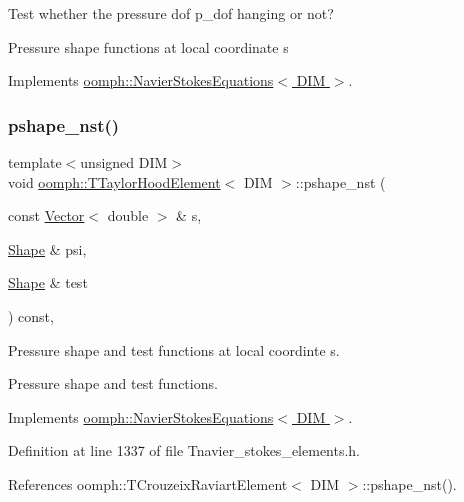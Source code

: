 Test whether the pressure dof p\+\_\+dof hanging or not? 

Pressure shape functions at local coordinate s 

Implements \hyperlink{classoomph_1_1NavierStokesEquations_a487030303b71da299aed3d4639a022ab}{oomph\+::\+Navier\+Stokes\+Equations$<$ D\+I\+M $>$}.

\mbox{\label{classoomph_1_1TTaylorHoodElement_a73ffecb519bf03336ea6cfe2eb7567df}} 
\subsubsection{\texorpdfstring{pshape\+\_\+nst()}{pshape\_nst()}\hspace{0.1cm}{\footnotesize\ttfamily [2/4]}}
{\footnotesize\ttfamily template$<$unsigned D\+IM$>$ \\
void \hyperlink{classoomph_1_1TTaylorHoodElement}{oomph\+::\+T\+Taylor\+Hood\+Element}$<$ D\+IM $>$\+::pshape\+\_\+nst (\begin{DoxyParamCaption}\item[{const \hyperlink{classoomph_1_1Vector}{Vector}$<$ double $>$ \&}]{s,  }\item[{\hyperlink{classoomph_1_1Shape}{Shape} \&}]{psi,  }\item[{\hyperlink{classoomph_1_1Shape}{Shape} \&}]{test }\end{DoxyParamCaption}) const\hspace{0.3cm}{\ttfamily [inline]}, {\ttfamily [virtual]}}



Pressure shape and test functions at local coordinte s. 

Pressure shape and test functions. 

Implements \hyperlink{classoomph_1_1NavierStokesEquations_a55f96a5c9f985476aeb145f683d63001}{oomph\+::\+Navier\+Stokes\+Equations$<$ D\+I\+M $>$}.



Definition at line 1337 of file Tnavier\+\_\+stokes\+\_\+elements.\+h.



References oomph\+::\+T\+Crouzeix\+Raviart\+Element$<$ D\+I\+M $>$\+::pshape\+\_\+nst().

